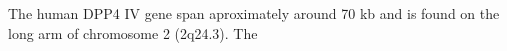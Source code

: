 The human DPP4 IV gene span aproximately around 70 kb and is found on the long arm of chromosome 2 (2q24.3). The 